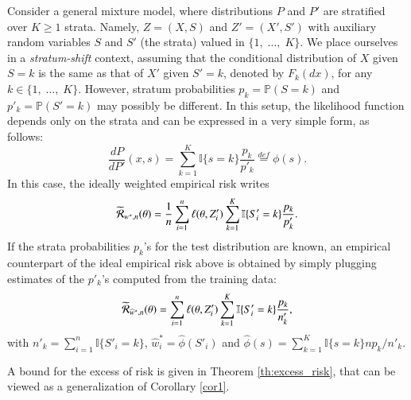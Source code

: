 \documentclass[12pt]{article}
\newcommand{\cR}{{\cal R}}
\begin{document}
Consider a general mixture model, where distributions $P$ and $P'$ are stratified over
$K\ge 1$ strata.  Namely, $Z=(X, S)$ and $Z'=(X', S')$ with auxiliary random variables $S$
and $S'$ (the strata) valued in $\{1,\; \ldots,\; K\}$.
We place ourselves in a \textit{stratum-shift} context, assuming that the conditional distribution of $X$ given $S=k$ is the same as that
of $X'$ given $S'=k$, denoted by $F_k(dx)$, for any $k\in\{1,\; \ldots,\; K \}$.  However, stratum probabilities $p_k = \mathbb{P}(S=k)$ and $p'_k = \mathbb{P}(S'=k)$ may possibly be different.
In this setup, the likelihood function depends only on the strata and can be expressed in a very simple form, as follows:
$$
    \frac{dP}{dP'}(x,s)=
    \sum_{k=1}^K \mathbb{I}\{s=k\} \frac{p_k}{p'_k}\overset{def}{=} \phi(s).
$$
In this case, the ideally weighted empirical risk writes
$$
    \widetilde{\cR}_{w^*,n}(\theta)=
    \frac{1}{n} \sum_{i=1}^n
    \ell(\theta,Z'_i) \sum_{k=1}^K \mathbb{I}\{S_i'=k\} \frac{p_k}{p'_k}.
$$
If the strata probabilities $p_k$'s for the test distribution are known,
an empirical counterpart of the ideal empirical risk above is obtained by simply plugging estimates of the $p'_k$'s computed from
the training data:
\begin{equation} \label{eq:strata_reweighting}
    \widetilde{\cR}_{\widehat{w}^*,n}(\theta)=
    \sum_{i=1}^n  \ell(\theta, Z'_i)
    \sum_{k=1}^K \mathbb{I}\{S_i'=k\}
    \frac{p_k }{n'_k},
\end{equation}
with $n'_k = \sum_{i=1}^n \mathbb{I}\{S'_i=k\}$, $\widehat{w}_i^*=\widehat{\phi}(S'_i)$ and
$
\widehat{\phi}(s)= \sum_{k=1}^K \mathbb{I}\{s=k\}  n p_k/n'_k$.

A bound for the excess of risk
is given in Theorem \ref{th:excess_risk},
that can be viewed as a generalization of Corollary \ref{cor1}.
\end{document}
